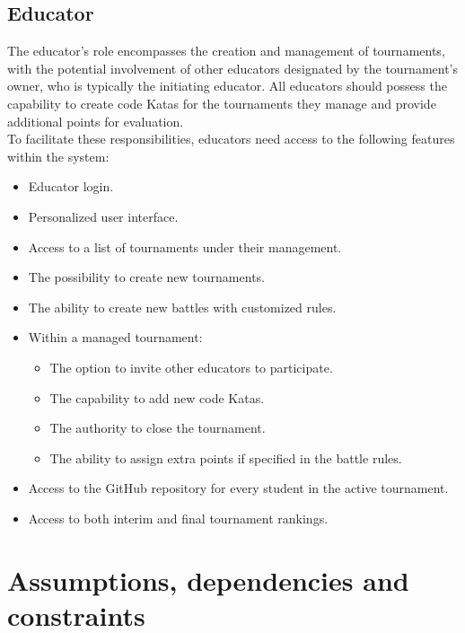 \documentclass[12pt, a4paper]{report}
\begin{document}
    \subsection{Educator}
    The educator's role encompasses the creation and management of tournaments, with the potential involvement of other educators designated by the tournament's owner, who is typically the initiating educator. 
    All educators should possess the capability to create code Katas for the tournaments they manage and provide additional points for evaluation. \\
    To facilitate these responsibilities, educators need access to the following features within the system:
    \begin{itemize}
        \item Educator login. 
        \item Personalized user interface. 
        \item Access to a list of tournaments under their management.
        \item The possibility to create new tournaments. 
        \item The ability to create new battles with customized rules. 
        \item Within a managed tournament: 
            \begin{itemize}
                \item The option to invite other educators to participate. 
                \item The capability to add new code Katas.
                \item The authority to close the tournament.
                \item The ability to assign extra points if specified in the battle rules.
            \end{itemize}
        \item Access to the GitHub repository for every student in the active tournament.
        \item Access to both interim and final tournament rankings.
    \end{itemize}

    \section{Assumptions, dependencies and constraints}
\end{document}
